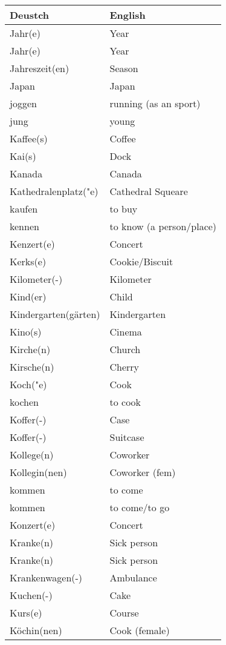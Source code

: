 \documentclass{article}
\renewcommand{\arraystretch}{1}
\begin{document}
\hfill
\begin{minipage}{0.48\textwidth}
    \centering
    \renewcommand{\arraystretch}{1.5}
    \begin{tabular}{|>{\raggedright\arraybackslash}p{3.5cm}|>{\raggedright\arraybackslash}p{3.5cm}|}
        \hline
        \rowcolor{gray!20} \textbf{Deustch} & \textbf{English} \\
        \hline
        Jahr(e) & Year \\\hline
        Jahr(e) & Year \\\hline
        Jahreszeit(en) & Season \\\hline
        Japan & Japan \\\hline
        joggen & running (as an sport) \\\hline
        jung & young \\\hline
        Kaffee(s) & Coffee \\\hline
        Kai(s) & Dock \\\hline
        Kanada & Canada \\\hline
        Kathedralenplatz("e) & Cathedral Squeare \\\hline
        kaufen & to buy \\\hline
        kennen & to know (a person/place) \\\hline
        Kenzert(e) & Concert \\\hline
        Kerks(e) & Cookie/Biscuit \\\hline
        Kilometer(-) & Kilometer \\\hline
        Kind(er) & Child \\\hline
        Kindergarten(gärten) & Kindergarten \\\hline
        Kino(s) & Cinema \\\hline
        Kirche(n) & Church \\\hline
        Kirsche(n) & Cherry \\\hline
        Koch("e) & Cook \\\hline
        kochen & to cook \\\hline
        Koffer(-) & Case \\\hline
        Koffer(-) & Suitcase \\\hline
        Kollege(n) & Coworker \\\hline
        Kollegin(nen) & Coworker (fem) \\\hline
        kommen & to come \\\hline
        kommen & to come/to go \\\hline
        Konzert(e) & Concert \\\hline
        Kranke(n) & Sick person \\\hline
        Kranke(n) & Sick person \\\hline
        Krankenwagen(-) & Ambulance \\\hline
        Kuchen(-) & Cake \\\hline
        Kurs(e) & Course \\\hline
        Köchin(nen) & Cook (female) \\\hline
    \end{tabular}
\end{minipage}
\end{document}
